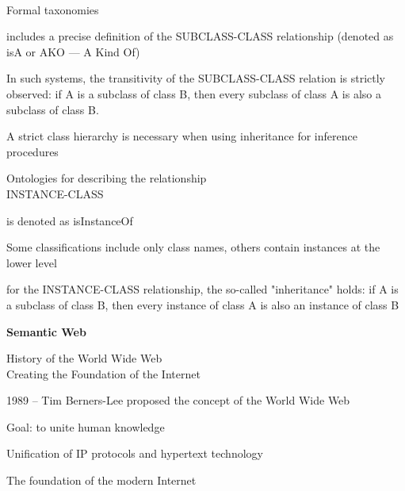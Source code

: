 \begin{frame}{\\Formal taxonomies}
	\topline
	\justifying
	
	\vspace{10mm}
	\begin{textitemize}
		\item includes a precise definition of the SUBCLASS-CLASS relationship (denoted as isA or AKO --- A Kind Of)
		\item In such systems, the transitivity of the SUBCLASS-CLASS relation is strictly observed: if A is a subclass of class B, then every subclass of class A is also a subclass of class B.
		\item A strict class hierarchy is necessary when using inheritance for inference procedures
	\end{textitemize}
	
\end{frame}

\begin{frame}{Ontologies for describing the relationship\\INSTANCE-CLASS}
	\topline
	\justifying
	
	\vspace{10mm}
	\begin{textitemize}
		\item is denoted as isInstanceOf
		\item Some classifications include only class names, others contain instances at the lower level
		\item for the INSTANCE-CLASS relationship, the so-called "inheritance"{} holds: if A is a subclass of class B, then every instance of class A is also an instance of class B
	\end{textitemize}
	
\end{frame}

\begin{frame}{}
	
	\centering
	
	\Huge
	
	\textbf{Semantic Web}
	
\end{frame}


\begin{frame}{History of the World Wide Web\\Creating the Foundation of the Internet}
	\topline
	\justifying
	
	\begin{textitemize}
		\item 1989 -- Tim Berners-Lee proposed the concept of the World Wide Web
		\item Goal: to unite human knowledge
		\item Unification of IP protocols and hypertext technology
		\item The foundation of the modern Internet
	\end{textitemize}
\end{frame}

